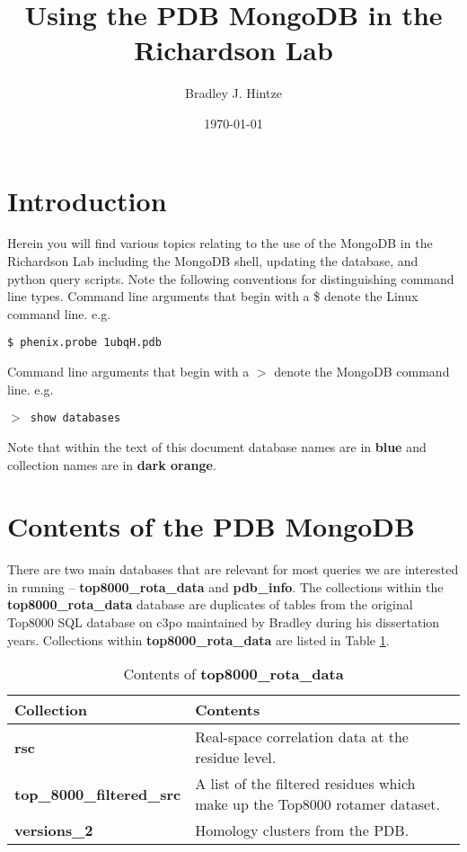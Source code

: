 \documentclass[12pt]{article}
\title{Using the PDB MongoDB in the Richardson Lab}
\author{Bradley J. Hintze}
\date{\today}
\newcommand{\cmdline}[1]{\vspace{5mm} \noindent
\texttt{\$ #1}
\vspace{5mm}

}
\newcommand{\mdbcmdline}[1]{\vspace{5mm} \noindent
\texttt{$>$ #1}
\vspace{5mm}

}
\newcommand{\mdbdb}[1]{{\color{BlueViolet}\textbf{#1}}}
\newcommand{\mdbcol}[1]{{\color{Bittersweet}\textbf{#1}}}
\begin{document}
\maketitle
\tableofcontents
\newpage

\section{Introduction}
Herein you will find various topics relating to the use of the MongoDB in the Richardson Lab including the MongoDB shell, updating the database, and python query scripts.
Note the following conventions for distinguishing command line types.
Command line arguments that begin with a \$ denote the Linux command line. e.g.

\cmdline{phenix.probe 1ubqH.pdb}
\noindent
Command line arguments that begin with a $>$ denote the MongoDB command line. e.g.

\mdbcmdline{show databases}

\noindent
Note that within the text of this document database names are in \mdbdb{blue} and collection names are in \mdbcol{dark orange}.

\section{Contents of the PDB MongoDB}
\label{sec:MongoDBContents}
There are two main databases that are relevant for most queries we are interested in running -- \mdbdb{top8000\_rota\_data} and \mdbdb{pdb\_info}.
The collections within the \mdbdb{top8000\_rota\_data} database are duplicates of tables from the original Top8000 SQL database on c3po maintained by Bradley during his dissertation years.
Collections within \mdbdb{top8000\_rota\_data} are listed in Table \ref{tab:T8kDB}.

\begin{table}[h]
\caption{Contents of \mdbdb{top8000\_rota\_data}}
\begin{tabular}{l|p{8cm}}
  \textbf{Collection} & \textbf{Contents} \\ \hline
  \mdbcol{rsc} & Real-space correlation data at the residue level. \\ \hline
  \mdbcol{top\_8000\_filtered\_src} & A list of the filtered residues which make up the Top8000 rotamer dataset. \\ 
   \mdbcol{versions\_2} & Homology clusters from the PDB. \\ \hline
\end{tabular}
\label{tab:T8kDB}
\end{table}
\end{document}
